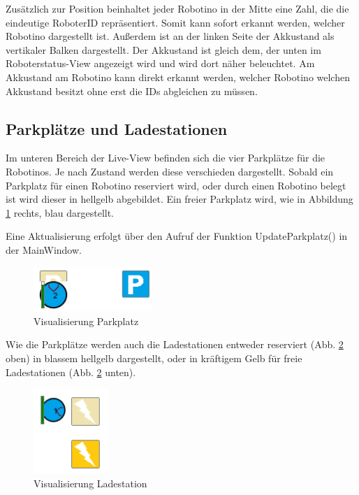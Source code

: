 Zusätzlich zur Position beinhaltet jeder Robotino in der Mitte eine Zahl, die die eindeutige RoboterID repräsentiert. Somit kann sofort erkannt werden, welcher Robotino dargestellt ist. Außerdem ist an der linken Seite der Akkustand als vertikaler Balken dargestellt. Der Akkustand ist gleich dem, der unten im Roboterstatus-View angezeigt wird und wird dort näher beleuchtet. Am Akkustand am Robotino kann direkt erkannt werden, welcher Robotino welchen Akkustand besitzt ohne erst die IDs abgleichen zu müssen.  

\subsection{Parkplätze und Ladestationen}

Im unteren Bereich der Live-View befinden sich die vier Parkplätze für die Robotinos. Je nach Zustand werden diese verschieden dargestellt. Sobald ein Parkplatz für einen Robotino reserviert wird, oder durch einen Robotino belegt ist wird dieser in hellgelb abgebildet. 
Ein freier Parkplatz wird, wie in Abbildung \ref{fig:Parkplatz} rechts, blau dargestellt. 

Eine Aktualisierung erfolgt über den Aufruf der Funktion UpdateParkplatz() in der MainWindow. 

\begin{figure}[htb]
    \centering
    \includegraphics[width=0.4\textwidth]{Abbildungen/Parkplatz.png}
    \caption{Visualisierung Parkplatz}		
    \label{fig:Parkplatz}
\end{figure}

Wie die Parkplätze werden auch die Ladestationen entweder reserviert (Abb. \ref{fig:Ladestation} oben) in blassem hellgelb dargestellt, oder in kräftigem Gelb für freie Ladestationen (Abb. \ref{fig:Ladestation} unten). 

\begin{figure}[htb]
    \centering
    \includegraphics[width=0.25\textwidth]{Abbildungen/Laden.png}
    \caption{Visualisierung Ladestation}		
    \label{fig:Ladestation}
\end{figure}

